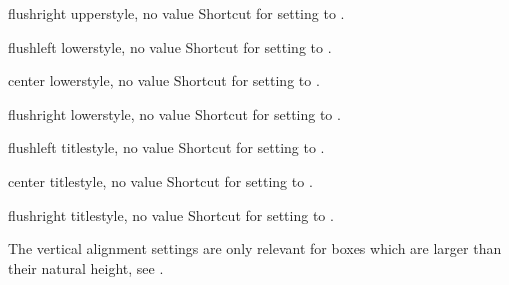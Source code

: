 \begin{docTcbKey}[][doc updated=2015-05-07]{flushright upper}{}{style, no value}
  Shortcut for setting  to .
\end{docTcbKey}

\begin{docTcbKey}[][doc updated=2015-05-07]{flushleft lower}{}{style, no value}
  Shortcut for setting  to .
\end{docTcbKey}

\begin{docTcbKey}[][doc updated=2015-05-07]{center lower}{}{style, no value}
  Shortcut for setting  to .
\end{docTcbKey}

\begin{docTcbKey}[][doc updated=2015-05-07]{flushright lower}{}{style, no value}
  Shortcut for setting  to .
\end{docTcbKey}

\clearpage

\begin{docTcbKey}[][doc updated=2015-05-07]{flushleft title}{}{style, no value}
  Shortcut for setting  to .
\end{docTcbKey}

\begin{docTcbKey}[][doc updated=2015-05-07]{center title}{}{style, no value}
  Shortcut for setting  to .
\end{docTcbKey}

\begin{docTcbKey}[][doc updated=2015-05-07]{flushright title}{}{style, no value}
  Shortcut for setting  to .
\end{docTcbKey}


\begin{marker}
The vertical alignment settings are only relevant for boxes which are larger
than their natural height, see .
\end{marker}

